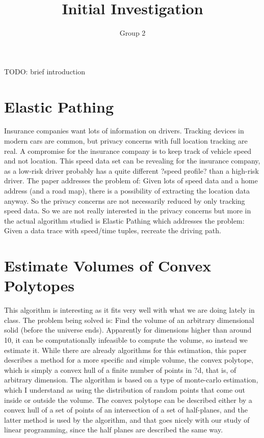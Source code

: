 \documentclass[11pt]{article}
\title{Initial Investigation}
\author{Group 2}
\begin{document}
\maketitle

TODO: brief introduction

\section{Elastic Pathing\cite{Gao}}
Insurance companies want lots of information on drivers. Tracking devices in modern cars are common, but privacy concerns with full location tracking are real. A compromise for the insurance company is to keep track of vehicle speed and not location. This speed data set can be revealing for the insurance company, as a low-risk driver probably has a quite different ?speed profile? than a high-risk driver.
The paper addresses the problem of:  Given lots of speed data and a home address (and a road map), there is a possibility of extracting the location data anyway.  So the privacy concerns are not necessarily reduced by only tracking speed data.
So we are not really interested in the privacy concerns but more in the actual algorithm studied is Elastic Pathing which addresses the problem:
Given a data trace with speed/time tuples, recreate the driving path.

\section{Estimate Volumes of Convex Polytopes\cite{Ge}}
This algorithm is interesting as it fits very well with what we are doing lately in class. The problem being solved is:  Find the volume of an arbitrary dimensional solid (before the universe ends).  Apparently for dimensions higher than around 10, it can be computationally infeasible to compute the volume, so instead we estimate it. While there are already algorithms for this estimation, this paper describes a method for a more specific and simple volume, the convex polytope, which is simply a convex hull of a finite number of points in ?d, that is, of arbitrary dimension.
The algorithm is based on a type of monte-carlo estimation, which I understand as using the distribution of random points that come out inside or outside the volume.
The convex polytope can be described either by a convex hull of a set of points of an intersection of a set of half-planes, and the latter method is used by the algorithm, and that goes nicely with our study of linear programming, since the half planes are described the same way.
\end{document}
